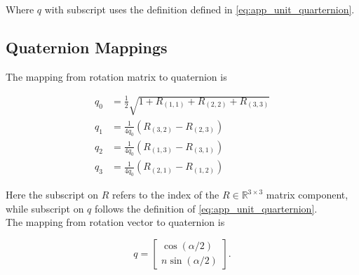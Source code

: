 Where $q$ with subscript uses the definition defined in \eqref{eq:app_unit_quarternion}.

\subsection{Quaternion Mappings}

The mapping from rotation matrix to quaternion is %

\begin{equation}
	\label{eq:app_rotmat2quat}
	\begin{aligned} q_{0} &=\frac{1}{2} \sqrt{1+R_{(1,1)}+R_{(2,2)}+R_{(3,3)}} \\ 
		q_{1} &=\frac{1}{4 q_{0}}\left(R_{(3,2)}-R_{(2,3)}\right) \\ 
		q_{2} &=\frac{1}{4 q_{0}}\left(R_{(1,3)}-R_{(3,1)}\right) \\ 
		q_{3} &=\frac{1}{4 q_{0}}\left(R_{(2,1)}-R_{(1,2)}\right) \end{aligned}
\end{equation}

Here the subscript on $R$ refers to the index of the $R \in \mathbb{R}^{3 \times 3}$ matrix component, while subscript on $q$ follows the definition of \eqref{eq:app_unit_quarternion}. \\
The mapping from rotation vector to quaternion is %

\begin{equation}
	\label{eq:app_rotvec2quat}
	q =\left[\begin{array}{l}{\cos (\alpha / 2)} \\
		{n \sin (\alpha / 2)} \end{array}\right].
\end{equation}
